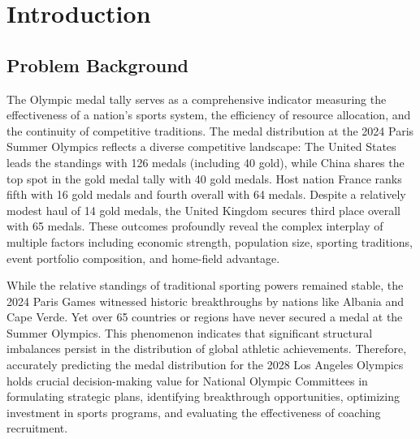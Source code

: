 \documentclass{mcmthesis}
\begin{document}

\section{Introduction}

\subsection{Problem Background}
The Olympic medal tally serves as a comprehensive indicator measuring the effectiveness of a nation's sports system, the efficiency of resource allocation, and the continuity of competitive traditions. The medal distribution at the 2024 Paris Summer Olympics reflects a diverse competitive landscape: The United States leads the standings with 126 medals (including 40 gold), while China shares the top spot in the gold medal tally with 40 gold medals. Host nation France ranks fifth with 16 gold medals and fourth overall with 64 medals. Despite a relatively modest haul of 14 gold medals, the United Kingdom secures third place overall with 65 medals. These outcomes profoundly reveal the complex interplay of multiple factors including economic strength, population size, sporting traditions, event portfolio composition, and home-field advantage.

While the relative standings of traditional sporting powers remained stable, the 2024 Paris Games witnessed historic breakthroughs by nations like Albania and Cape Verde. Yet over 65 countries or regions have never secured a medal at the Summer Olympics. This phenomenon indicates that significant structural imbalances persist in the distribution of global athletic achievements. Therefore, accurately predicting the medal distribution for the 2028 Los Angeles Olympics holds crucial decision-making value for National Olympic Committees in formulating strategic plans, identifying breakthrough opportunities, optimizing investment in sports programs, and evaluating the effectiveness of coaching recruitment.
\end{document}
